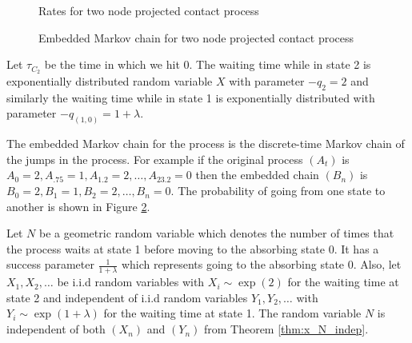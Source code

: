 \documentclass{article}
\theoremstyle{plain}
\theoremstyle{definition}
\theoremstyle{remark}
\numberwithin{equation}{section}
\begin{document}
\begin{figure}[H]
    \centering
    \caption{Rates for two node projected contact process}
    \label{fig:rates_mc_two_contact}
\end{figure}

\begin{figure}[H]
    \centering
    \caption{Embedded Markov chain for two node projected contact process}
    \label{fig:discrete_mc_two_contact}
\end{figure}

Let $\tau_{C_2}$ be the time in which we hit 0.
The waiting time while in state 2 is exponentially distributed random variable $X$ with parameter $- q_{2} = 2$ and similarly the waiting time while in state 1 is exponentially distributed with parameter $- q_{(1,0)} = 1 + \lambda$.

The embedded Markov chain for the process is the discrete-time Markov chain of the jumps in the process.
For example if the original process $(A_t)$ is $A_{0} = 2, A_{.75} = 1, A_{1.2} = 2, \ldots, A_{23.2} = 0$ then the embedded chain $(B_n)$ is $B_{0} = 2, B_1 = 1, B_2 = 2, \ldots, B_n = 0$.
The probability of going from one state to another is shown in Figure \ref{fig:discrete_mc_two_contact}.

Let $N$ be a geometric random variable which denotes the number of times that the process waits at state 1 before moving to the absorbing state 0.
It has a success parameter $\frac{1}{1 + \lambda}$ which represents going to the absorbing state 0.
Also, let $X_1, X_2, \ldots$ be i.i.d random variables with
$X_i \sim \exp(2)$ for the waiting time at state 2 and independent of i.i.d random variables $Y_1, Y_2, \ldots$ with  $Y_i \sim \exp(1 + \lambda)$ for the waiting time at state 1.
The random variable $N$ is independent of both $(X_n)$ and $(Y_n)$ from Theorem \ref{thm:x_N_indep}.
\end{document}
